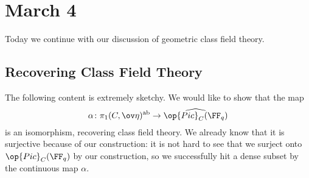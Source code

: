 \documentclass[../notes.tex]{subfiles}
\begin{document}
\section{March 4}
Today we continue with our discussion of geometric class field theory.

\subsection{Recovering Class Field Theory}
The following content is extremely sketchy.
We would like to show that the map
\[\alpha\colon\pi_1(C,\ov\eta)^{\mathrm{ab}}\to\widehat{\op{Pic}_C(\FF_q)}\]
is an isomorphism, recovering class field theory. We already know that it is surjective because of our construction: it is not hard to see that we surject onto $\op{Pic}_C(\FF_q)$ by our construction, so we successfully hit a dense subset by the continuous map $\alpha$.
\end{document}
